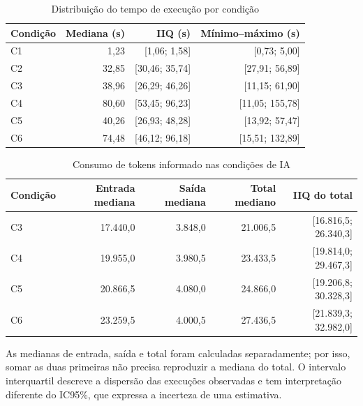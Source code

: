 \begin{table}[htb]
\ABNTEXfontereduzida
\caption{\label{tab:operacional-resultados}Distribuição do tempo de execução por condição}
\centering
\begin{tabular}{lrrr}
\hline
\textbf{Condição} & \textbf{Mediana (s)} &
\textbf{IIQ (s)} & \textbf{Mínimo--máximo (s)} \\
\hline
C1 & 1,23 & [1,06; 1,58] & [0,73; 5,00] \\
C2 & 32,85 & [30,46; 35,74] & [27,91; 56,89] \\
C3 & 38,96 & [26,29; 46,26] & [11,15; 61,90] \\
C4 & 80,60 & [53,45; 96,23] & [11,05; 155,78] \\
C5 & 40,26 & [26,93; 48,28] & [13,92; 57,47] \\
C6 & 74,48 & [46,12; 96,18] & [15,51; 132,89] \\
\hline
\end{tabular}
\end{table}

\begin{table}[htb]
\ABNTEXfontereduzida
\caption{\label{tab:tokens-resultados}Consumo de tokens informado nas condições de IA}
\centering
\begin{tabular}{lrrrr}
\hline
\textbf{Condição} & \textbf{Entrada mediana} & \textbf{Saída mediana} &
\textbf{Total mediano} & \textbf{IIQ do total} \\
\hline
C3 & 17.440,0 & 3.848,0 & 21.006,5 & [16.816,5; 26.340,3] \\
C4 & 19.955,0 & 3.980,5 & 23.433,5 & [19.814,0; 29.467,3] \\
C5 & 20.866,5 & 4.080,0 & 24.866,0 & [19.206,8; 30.328,3] \\
C6 & 23.259,5 & 4.000,5 & 27.436,5 & [21.839,3; 32.982,0] \\
\hline
\end{tabular}
\end{table}

As medianas de entrada, saída e total foram calculadas separadamente; por isso,
somar as duas primeiras não precisa reproduzir a mediana do total. O intervalo
interquartil descreve a dispersão das execuções observadas e tem interpretação
diferente do IC95\%, que expressa a incerteza de uma estimativa.

